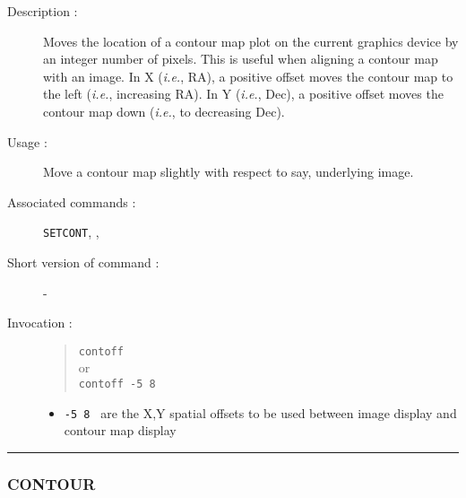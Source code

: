 \begin{description}

\item[Description :] Moves the location of a contour map plot on the
current graphics device by an integer number of pixels.  This is useful
when aligning a contour map with an image.  In X (\emph{i.e.}, RA), a
positive offset moves the contour map to the left (\emph{i.e.},
increasing RA).  In Y (\emph{i.e.}, Dec), a positive offset moves the
contour map down (\emph{i.e.}, to decreasing Dec).

\item[Usage :] Move a contour map slightly with respect to
say, underlying image.

\item[Associated commands :] {\tt {}SETCONT},
{\tt {}}, {\tt {}}
\item[Short version of command :] -
\item[Invocation :]

\begin{quote}{\tt  contoff }\\
or \\
{\tt contoff -5 8 }
\end{quote}

\begin{itemize}

\item {\tt -5 8 } are the X,Y spatial offsets to be used between image
display and contour map display
\end{itemize}

\end{description}

\hrule
\subsubsection*{\label{CONTOUR}CONTOUR}

